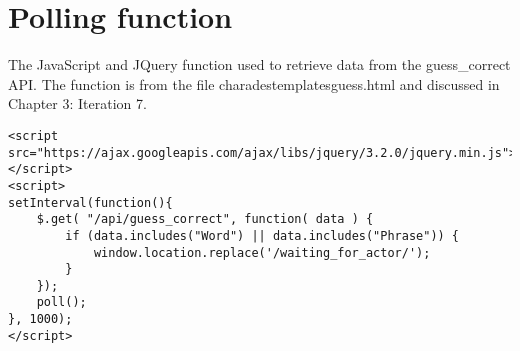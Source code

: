 \newpage


\section{Polling function}

The JavaScript and JQuery function used to retrieve data from the guess\_correct API. The function is from the file charades\/templates\/guess.html and discussed in Chapter 3: Iteration 7.

\begin{verbatim}
<script
src="https://ajax.googleapis.com/ajax/libs/jquery/3.2.0/jquery.min.js">
</script>
<script>
setInterval(function(){
    $.get( "/api/guess_correct", function( data ) {
        if (data.includes("Word") || data.includes("Phrase")) {
            window.location.replace('/waiting_for_actor/');
        }
    });
    poll();
}, 1000);
</script>
\end{verbatim}